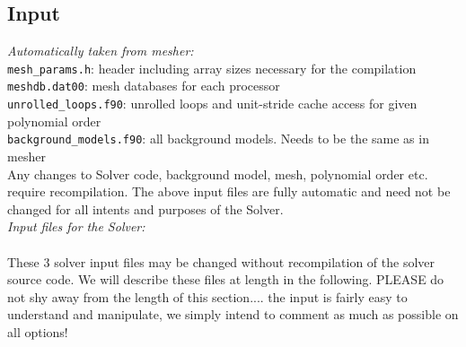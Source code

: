 \documentclass[11pt,letter,fleqn,english,notitlepage]{article}
\begin{document}
\subsection{Input}

\textit{Automatically taken from mesher:} \\
{\tt mesh\_params.h}: header including array sizes necessary for the compilation\\
{\tt meshdb.dat00\*}: mesh databases for each processor\\
{\tt unrolled\_loops.f90}: unrolled loops and unit-stride cache access for given polynomial order\\
{\tt background\_models.f90}: all background models. Needs to be the same as in mesher\\

\noindent Any changes to Solver code, background model, mesh, polynomial order etc. require 
recompilation. The above input files are fully automatic and need not be changed for all intents 
and purposes of the Solver.\\

\noindent \textit{Input files for the Solver:} \\
\\
These 3 solver input files may be changed without recompilation of the solver 
source code. We will describe these files at length in the following. PLEASE do not shy away from the 
length of this section.... the input is fairly easy to understand and manipulate, 
we simply intend to comment as much as possible on all options!\\
\end{document}
